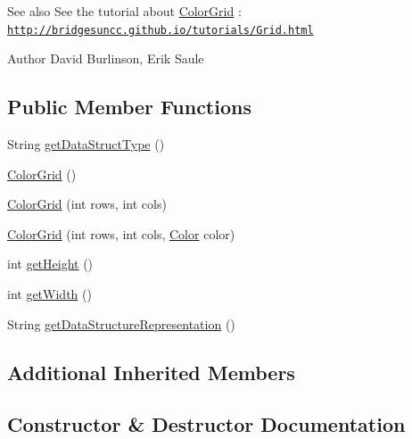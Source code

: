 \begin{DoxySeeAlso}{See also}
See the tutorial about \hyperlink{classbridges_1_1base_1_1_color_grid}{Color\+Grid} \+: \href{http://bridgesuncc.github.io/tutorials/Grid.html}{\tt http\+://bridgesuncc.\+github.\+io/tutorials/\+Grid.\+html}
\end{DoxySeeAlso}
\begin{DoxyAuthor}{Author}
David Burlinson, Erik Saule 
\end{DoxyAuthor}
\subsection*{Public Member Functions}
\begin{DoxyCompactItemize}
\item 
String \hyperlink{classbridges_1_1base_1_1_color_grid_a53a1f3f105f8545796f98e5fac559b5b}{get\+Data\+Struct\+Type} ()
\item 
\hyperlink{classbridges_1_1base_1_1_color_grid_af434a5a3dcbaf86e51ac6f9e1c1d7e5f}{Color\+Grid} ()
\item 
\hyperlink{classbridges_1_1base_1_1_color_grid_aafb4157a4c8129f30c1f989fcdfda544}{Color\+Grid} (int rows, int cols)
\item 
\hyperlink{classbridges_1_1base_1_1_color_grid_aef40242c93b66ab851e6afa64cada0b5}{Color\+Grid} (int rows, int cols, \hyperlink{classbridges_1_1base_1_1_color}{Color} color)
\item 
int \hyperlink{classbridges_1_1base_1_1_color_grid_a8793791e35f03b3e5a2e5ef3606ac124}{get\+Height} ()
\item 
int \hyperlink{classbridges_1_1base_1_1_color_grid_af872226de86ac8e8f2553fdc5bddc375}{get\+Width} ()
\item 
String \hyperlink{classbridges_1_1base_1_1_color_grid_a81ca0995d17b6cb31122b718dfa57286}{get\+Data\+Structure\+Representation} ()
\end{DoxyCompactItemize}
\subsection*{Additional Inherited Members}


\subsection{Constructor \& Destructor Documentation}
\mbox{\label{classbridges_1_1base_1_1_color_grid_af434a5a3dcbaf86e51ac6f9e1c1d7e5f}} 
